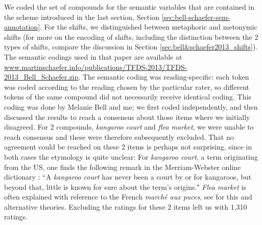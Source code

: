 We coded the set of compounds for the semantic variables that are
contained in the
scheme introduced in the last section, Section
\ref{sec:bell-schaefer-sem-annotation}. For the shifts, we distinguished
between metaphoric and metonymic shifts (for more on the encoding of
shifts, including the distinction between the 2 types of shifts, compare the discussion in Section \ref{sec:bell&schaefer2013_shifts}). 
The semantic codings used in
that paper are available at
\url{www.martinschaefer.info/publications/TFDS-2013/TFDS-2013_Bell_Schaefer.zip}. The
semantic coding was reading-specific: each token was coded
according to the reading chosen by the particular rater,
so different tokens of the same compound did not necessarily receive
identical coding.  This coding was done by Melanie Bell and me; we first coded independently, and then discussed the results
to reach a consensus about those items where we initially
disagreed. For 2 compounds, \emph{kangaroo court} and \emph{flea
  market}, we were unable to reach consensus and these were therefore
subsequently excluded. That no agreement could be reached on these 2
items is perhaps not surprising, since in both cases the etymology is
quite unclear: For \emph{kangaroo court}, a term originating from the
US, one finds the following remark in the Merriam-Webster online
dictionary \citep{Merriam-Webster:2015}: ``A \emph{kangaroo court} has never been a court by or for kangaroos, but beyond that, little is known for sure about the term's origins."   
\emph{Flea market} is often explained with reference to the French \emph{marché aux puces}, see \cite{Mike:2012} for this and alternative theories.
Excluding the ratings for these 2 items left us with 1,310 ratings. 

